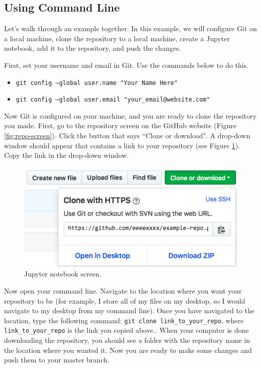 \documentclass[11pt,a4paper]{article}
\begin{document}
\subsection{Using Command Line} \label{command-line}
Let's walk through an example together.
In this example, we will configure Git on a local machine, clone the repository to a local machine, create a Jupyter notebook, add it to the repository, and push the changes.

First, set your username and email in Git.
Use the commands below to do this.

\begin{itemize}
\item[] \texttt{git config --global user.name "Your Name Here"}
\item[] \texttt{git config --global user.email "your\_email@website.com"}
\end{itemize}

Now Git is configured on your machine, and you are ready to clone the repository you made.
First, go to the repository screen on the GitHub website (Figure \ref{fig:repo-screen}).
Click the button that says ``Clone or download".
A drop-down window should appear that contains a link to your repository (see Figure \ref{fig:clone-screen}).
Copy the link in the drop-down window.

\begin{figure}[h!]
\centering
\includegraphics[width=.7\textwidth]{figures/clone_screen.png}
\caption{Jupyter notebook screen.}
\label{fig:clone-screen}
\end{figure}

Now open your command line.
Navigate to the location where you want your repository to be (for example, I store all of my files on my desktop, so I would navigate to my desktop from my command line).
Once you have navigated to the location, type the following command: \texttt{git clone link\_to\_your\_repo}, where \texttt{link\_to\_your\_repo} is the link you copied above..
When your computer is done downloading the repository, you should see a folder with the repository name in the location where you wanted it.
Now you are ready to make some changes and push them to your master branch.
\end{document}
